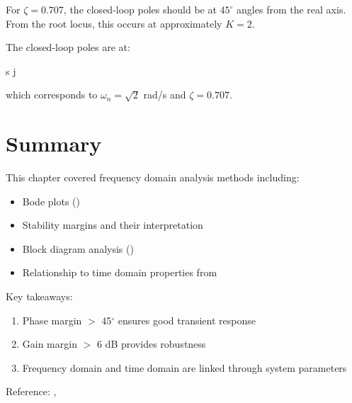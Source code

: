 \documentclass{../coursenotes}
\begin{document}
\begin{solution}
For $\zeta = 0.707$, the closed-loop poles should be at $45^\circ$ angles from the real axis. From the root locus, this occurs at approximately $K = 2$.

The closed-loop poles are at:
\begin{mmath}
s  \pm j
\end{mmath}

which corresponds to $\omega_n = \sqrt{2}$ rad/s and $\zeta = 0.707$.
\end{solution}


\section{Summary}

This chapter covered frequency domain analysis methods including:
\begin{itemize}
\item Bode plots ()
\item Stability margins and their interpretation
\item Block diagram analysis ()
\item Relationship to time domain properties from 
\end{itemize}

Key takeaways:
\begin{enumerate}
\item Phase margin $>$ 45$^\circ$ ensures good transient response
\item Gain margin $>$ 6 dB provides robustness
\item Frequency domain and time domain are linked through system parameters
\end{enumerate}


Reference: , 
\end{document}
